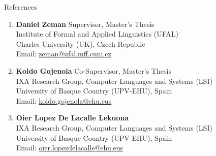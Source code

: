 \documentclass{resume} %
\begin{document}

\begin{rSection}{References}

    \begin{enumerate}
        \item \textbf{Daniel Zeman} \hfill Supervisor, Master's Thesis\\
            Institute of Formal and Applied Linguistics (UFAL)\\
            Charles University (UK), Czech Republic\\
            Email: \url{zeman@ufal.mff.cuni.cz}
        
        \item \textbf{Koldo Gojenola} \hfill Co-Supervisor, Master's Thesis\\
            IXA Research Group, Computer Languages and Systems (LSI)\\
            University of Basque Country (UPV-EHU), Spain\\
            Email: \url{koldo.gojenola@ehu.eus}
        
        \item \textbf{Oier Lopez De Lacalle Lekuona}\\
            IXA Research Group, Computer Languages and Systems (LSI)\\
            University of Basque Country (UPV-EHU), Spain\\
            Email: \url{oier.lopezdelacalle@ehu.eus}
    \end{enumerate}

\end{rSection}
\end{document}
